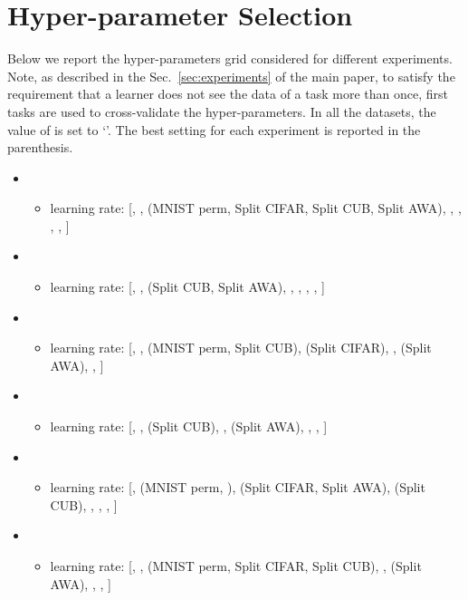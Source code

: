 \section{Hyper-parameter Selection}
\label{sec:supp_hyperparam_selec}
Below we report the hyper-parameters grid considered for different experiments. Note, as described in the Sec.~\ref{sec:experiments} of the main paper, to satisfy the requirement that a learner does not see the data of a task more than once, first  tasks are used to cross-validate the hyper-parameters. In all the datasets, the value of  is set to `'. The best setting for each experiment is reported in the parenthesis.
\begin{itemize}
        \item {\mtask}
                \begin{itemize}
                        \item learning rate: [, ,  (MNIST perm, Split CIFAR, Split CUB, Split AWA), , , , , ]
                \end{itemize}
        \item {\mtaskz} 
                \begin{itemize}
                        \item learning rate: [, ,  (Split CUB, Split AWA), , , , , ]
                \end{itemize}
        \item {\van}
                \begin{itemize}
                        \item learning rate: [, ,  (MNIST perm, Split CUB),  (Split CIFAR), ,  (Split AWA), , ]
                \end{itemize}
        \item {\vanz}
                \begin{itemize}
                                \item learning rate: [, ,  (Split CUB), ,  (Split AWA), , , ]
                \end{itemize}
        \item {\pnn}
                \begin{itemize}
                        \item learning rate: [,  (MNIST perm, ),  (Split CIFAR, Split AWA),  (Split CUB), , , , ]
                \end{itemize}
        \item {\ewc}
                \begin{itemize}
                        \item learning rate: [, ,  (MNIST perm, Split CIFAR, Split CUB), ,  (Split AWA), , , ]

\end{itemize}
\end{itemize}
